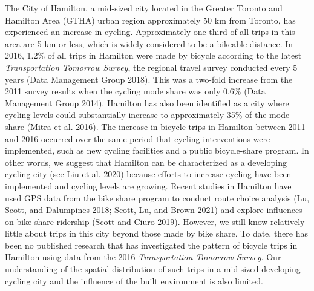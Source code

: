 \documentclass[smallextended]{svjour3}       %
\begin{document}
The City of Hamilton, a mid-sized city located in the Greater Toronto
and Hamilton Area (GTHA) urban region approximately 50 km from Toronto,
has experienced an increase in cycling. Approximately one third of all
trips in this area are 5 km or less, which is widely considered to be a
bikeable distance. In 2016, 1.2\% of all trips in Hamilton were made by
bicycle according to the latest \emph{Transportation Tomorrow Survey},
the regional travel survey conducted every 5 years (Data Management
Group 2018). This was a two-fold increase from the 2011 survey results
when the cycling mode share was only 0.6\% (Data Management Group 2014).
Hamilton has also been identified as a city where cycling levels could
substantially increase to approximately 35\% of the mode share (Mitra et
al. 2016). The increase in bicycle trips in Hamilton between 2011 and
2016 occurred over the same period that cycling interventions were
implemented, such as new cycling facilities and a public bicycle-share
program. In other words, we suggest that Hamilton can be characterized
as a developing cycling city (see Liu et al. 2020) because efforts to
increase cycling have been implemented and cycling levels are growing.
Recent studies in Hamilton have used GPS data from the bike share
program to conduct route choice analysis (Lu, Scott, and Dalumpines
2018; Scott, Lu, and Brown 2021) and explore influences on bike share
ridership (Scott and Ciuro 2019). However, we still know relatively
little about trips in this city beyond those made by bike share. To
date, there has been no published research that has investigated the
pattern of bicycle trips in Hamilton using data from the 2016
\emph{Transportation Tomorrow Survey}. Our understanding of the spatial
distribution of such trips in a mid-sized developing cycling city and
the influence of the built environment is also limited.
\end{document}
